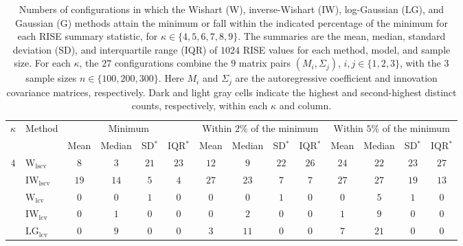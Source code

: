 \begin{table}[!htp]
\caption{Numbers of configurations in which the Wishart (W), inverse-Wishart (IW), log-Gaussian (LG), and Gaussian (G) methods attain the minimum or fall within the indicated percentage of the minimum for each RISE summary statistic, for $\kappa\in\{4,5,6,7,8,9\}$. The summaries are the mean, median, standard deviation (SD), and interquartile range (IQR) of $1024$ RISE values for each method, model, and sample size. For each $\kappa$, the $27$ configurations combine the $9$ matrix pairs $(M_i,\Sigma_j)$, $i,j\in\{1,2,3\}$, with the $3$ sample sizes $n\in\{100,200,300\}$. Here $M_i$ and $\Sigma_j$ are the autoregressive coefficient and innovation covariance matrices, respectively. Dark and light gray cells indicate the highest and second-highest distinct counts, respectively, within each $\kappa$ and column.}
\label{tab:ranking.counts}
\centering
\fontsize{7.9}{7}\selectfont
\setlength{\tabcolsep}{4pt}
\renewcommand{\arraystretch}{0.15}
\begin{tabular}{clcccccccccccc}
\toprule
$\kappa$ & Method & \multicolumn{4}{c}{Minimum} & \multicolumn{4}{c}{Within $2\%$ of the minimum} & \multicolumn{4}{c}{Within $5\%$ of the minimum} \\
\cmidrule(lr){3-6}\cmidrule(lr){7-10}\cmidrule(lr){11-14}
 &  & Mean & Median & SD$^{*}$ & IQR$^{*}$ & Mean & Median & SD$^{*}$ & IQR$^{*}$ & Mean & Median & SD$^{*}$ & IQR$^{*}$ \\
\midrule
$4$ & $\mathrm{W}_{\mathrm{lscv}}$ & \cellcolor{black!10}$8$ & $3$ & \cellcolor{black!30}$21$ & \cellcolor{black!30}$23$ & \cellcolor{black!10}$12$ & $9$ & \cellcolor{black!30}$22$ & \cellcolor{black!30}$26$ & \cellcolor{black!10}$24$ & \cellcolor{black!10}$22$ & \cellcolor{black!30}$23$ & \cellcolor{black!30}$27$ \\
 & $\mathrm{IW}_{\mathrm{lscv}}$ & \cellcolor{black!30}$19$ & \cellcolor{black!30}$14$ & \cellcolor{black!10}$5$ & \cellcolor{black!10}$4$ & \cellcolor{black!30}$27$ & \cellcolor{black!30}$23$ & \cellcolor{black!10}$7$ & \cellcolor{black!10}$7$ & \cellcolor{black!30}$27$ & \cellcolor{black!30}$27$ & \cellcolor{black!10}$19$ & \cellcolor{black!10}$13$ \\
 & $\mathrm{W}_{\mathrm{lcv}}$ & $0$ & $0$ & $1$ & $0$ & $0$ & $0$ & $1$ & $0$ & $0$ & $5$ & $1$ & $0$ \\
 & $\mathrm{IW}_{\mathrm{lcv}}$ & $0$ & $1$ & $0$ & $0$ & $0$ & $2$ & $0$ & $0$ & $1$ & $9$ & $0$ & $0$ \\
 & $\mathrm{LG}_{\mathrm{lcv}}$ & $0$ & \cellcolor{black!10}$9$ & $0$ & $0$ & $3$ & \cellcolor{black!10}$11$ & $0$ & $0$ & $7$ & $21$ & $0$ & $0$ \\

\end{tabular}
\end{table}
